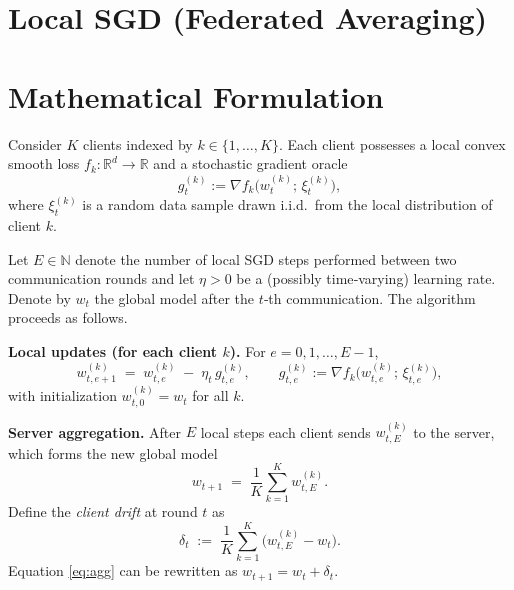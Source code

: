\documentclass[11pt]{article}
\newcommand{\R}{\mathbb{R}}
\begin{document}
\section*{Local SGD (Federated Averaging)}

\section*{Mathematical Formulation}
Consider $K$ clients indexed by $k\in\{1,\dots,K\}$.  
Each client possesses a local convex smooth loss $f_k:\R^d\rightarrow\R$ and a stochastic gradient oracle
\[
g_t^{(k)}:=\nabla f_k\big(w_t^{(k)};\,\xi_t^{(k)}\big),
\]
where $\xi_t^{(k)}$ is a random data sample drawn i.i.d.\ from the local distribution of client $k$.

Let $E\in\mathbb{N}$ denote the number of local SGD steps performed between two communication rounds and let $\eta>0$ be a (possibly time‑varying) learning rate.  
Denote by $w_t$ the global model after the $t$‑th communication.  
The algorithm proceeds as follows.

\medskip
\noindent\textbf{Local updates (for each client $k$).}  
For $e=0,1,\dots,E-1$,
\begin{equation}
\label{eq:local}
w_{t,e+1}^{(k)} \;=\; w_{t,e}^{(k)} \;-\; \eta_t\, g_{t,e}^{(k)},
\qquad g_{t,e}^{(k)}:=\nabla f_k\big(w_{t,e}^{(k)};\,\xi_{t,e}^{(k)}\big),
\end{equation}
with initialization $w_{t,0}^{(k)} = w_t$ for all $k$.

\medskip
\noindent\textbf{Server aggregation.}  
After $E$ local steps each client sends $w_{t,E}^{(k)}$ to the server, which forms the new global model
\begin{equation}
\label{eq:agg}
w_{t+1}\;=\;\frac{1}{K}\sum_{k=1}^{K} w_{t,E}^{(k)} .
\end{equation}
Define the \emph{client drift} at round $t$ as
\[
\delta_t \;:=\; \frac{1}{K}\sum_{k=1}^{K}\bigl(w_{t,E}^{(k)}-w_t\bigr).
\]
Equation \eqref{eq:agg} can be rewritten as $w_{t+1}=w_t+\delta_t$.
\end{document}
